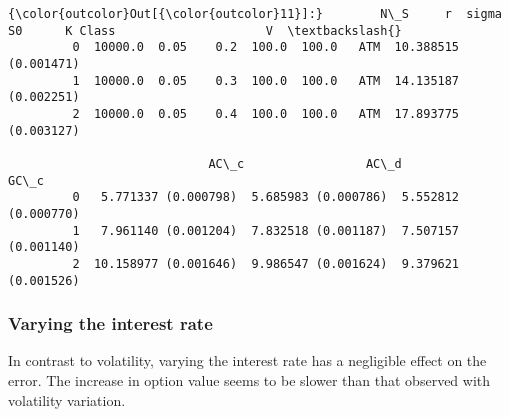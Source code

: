 \documentclass{article}
\begin{document}
            \begin{Verbatim}[commandchars=\\\{\}]
{\color{outcolor}Out[{\color{outcolor}11}]:}        N\_S     r  sigma     S0      K Class                     V  \textbackslash{}
         0  10000.0  0.05    0.2  100.0  100.0   ATM  10.388515 (0.001471)   
         1  10000.0  0.05    0.3  100.0  100.0   ATM  14.135187 (0.002251)   
         2  10000.0  0.05    0.4  100.0  100.0   ATM  17.893775 (0.003127)   
         
                            AC\_c                 AC\_d                 GC\_c  
         0   5.771337 (0.000798)  5.685983 (0.000786)  5.552812 (0.000770)  
         1   7.961140 (0.001204)  7.832518 (0.001187)  7.507157 (0.001140)  
         2  10.158977 (0.001646)  9.986547 (0.001624)  9.379621 (0.001526)  
\end{Verbatim}
        
    \subsubsection{Varying the interest
rate}\label{varying-the-interest-rate}

In contrast to volatility, varying the interest rate has a negligible
effect on the error. The increase in option value seems to be slower
than that observed with volatility variation.
\end{document}
